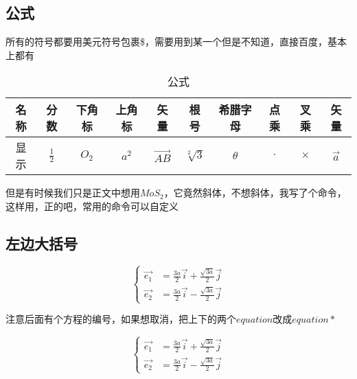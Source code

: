 \documentclass[AutoFakeBold]{LZUThesis}
\begin{document}


\subsection{公式} %
\label{sub:公式}
所有的符号都要用美元符号包裹\$，需要用到某一个但是不知道，直接百度，基本上都有
\begin{table}[H]
    \centering
    \caption{公式}
    \begin{tabular}{cccccccccc} %
    \toprule
    名称& 分数 & 下角标 & 上角标  & 矢量 & 根号 & 希腊字母 & 点乘 & 叉乘 & 矢量\\
    \midrule
    显示 & $\frac{1}{2}$ & $O_2$  & $a^2$ & $\vec{AB}$ & $\sqrt[2]{3}$ & $\theta$ & $\cdot$ & $\times$& $\vec{a}$\\
   
    \bottomrule
    \end{tabular}
    \label{tbl_gs}
\end{table}

但是有时候我们只是正文中想用$MoS_2$，它竟然斜体，不想斜体，我写了个命令，这样用，正的吧，常用的命令可以自定义


\subsection{左边大括号} %
\label{sub:左边大括号}

\begin{equation}
    \left\{
    \begin{array}{rcl}
        \vec{e_1} &= \frac{3a}{2} \vec{i} + \frac{\sqrt{3a}}{2} \vec{j} \\
        \vec{e_2} &= \frac{3a}{2} \vec{i} - \frac{\sqrt{3a}}{2} \vec{j}
    \end{array}
    \right.
    \label{e1e2}
\end{equation}

注意后面有个方程的编号，如果想取消，把上下的两个$equation$改成$equation*$

\begin{equation*}
    \left\{
    \begin{array}{rcl}
        \vec{e_1} &= \frac{3a}{2} \vec{i} + \frac{\sqrt{3a}}{2} \vec{j} \\
        \vec{e_2} &= \frac{3a}{2} \vec{i} - \frac{\sqrt{3a}}{2} \vec{j}
    \end{array}
    \right.
    \label{e1e2_2}
\end{equation*}
\end{document}
